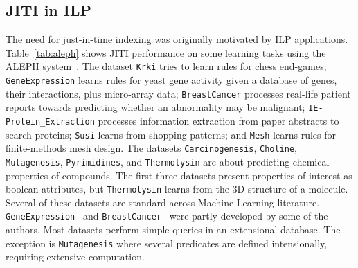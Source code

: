 \documentclass{llncs}
\begin{document}
\subsection{JITI in ILP} \label{sec:perf:ILP}
The need for just-in-time indexing was originally motivated by ILP
applications.  Table~\ref{tab:aleph} shows JITI performance on some
learning tasks using the ALEPH system~\cite{}. The dataset
\texttt{Krki} tries to learn rules for chess end-games;
\texttt{GeneExpression} learns rules for yeast gene activity given a
database of genes, their interactions, plus micro-array data;
\texttt{BreastCancer} processes real-life patient reports towards
predicting whether an abnormality may be malignant;
\texttt{IE-Protein\_Extraction} processes information extraction from
paper abstracts to search proteins; \texttt{Susi} learns from shopping
patterns; and \texttt{Mesh} learns rules for finite-methods mesh
design. The datasets \texttt{Carcinogenesis}, \texttt{Choline},
\texttt{Mutagenesis}, \texttt{Pyrimidines}, and \texttt{Thermolysin}
are about predicting chemical properties of compounds. The first three
datasets present properties of interest as boolean attributes, but
\texttt{Thermolysin} learns from the 3D structure of a molecule.
Several of these datasets are standard across Machine Learning
literature.  \texttt{GeneExpression}~\cite{} and
\texttt{BreastCancer}~\cite{} were partly developed by some of the
authors.  Most datasets perform simple queries in an extensional
database. The exception is \texttt{Mutagenesis} where several
predicates are defined intensionally, requiring extensive computation.
\end{document}
